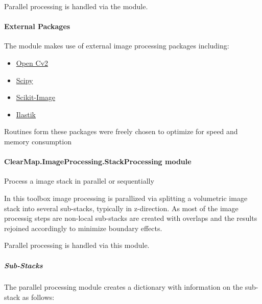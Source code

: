 \documentclass[letterpaper,10pt,english]{sphinxmanual}
\begin{document}
Parallel processing is handled via the
{\hyperref[api/ClearMap.ImageProcessing:module-ClearMap.ImageProcessing.StackProcessing]{\emph{}}} module.


\paragraph{External Packages}
\label{api/ClearMap.ImageProcessing:external-packages}
The {\hyperref[api/ClearMap.ImageProcessing:module-ClearMap.ImageProcessing]{\emph{}}} module makes use of external image
processing packages including:
\begin{itemize}
\item {} 
\href{http://opencv.org/}{Open Cv2}

\item {} 
\href{http://www.scipy.org/}{Scipy}

\item {} 
\href{http://scikit-image.org/docs/dev/api/skimage.html}{Scikit-Image}

\item {} 
\href{http://ilastik.org/}{Ilastik}

\end{itemize}

Routines form these packages were freely chosen to optimize for speed and
memory consumption


\paragraph{ClearMap.ImageProcessing.StackProcessing module}
\label{api/ClearMap.ImageProcessing:clearmap-imageprocessing-stackprocessing-module}\label{api/ClearMap.ImageProcessing:module-ClearMap.ImageProcessing.StackProcessing}
Process a image stack in parallel or sequentially

In this toolbox image processing is parallized via splitting a volumetric
image stack into several sub-stacks, typically in z-direction. As most of
the image processig steps are non-local sub-stacks are created with overlaps
and the results rejoined accordingly to minimize boundary effects.

Parallel processing is handled via this module.


\subparagraph{Sub-Stacks}
\label{api/ClearMap.ImageProcessing:sub-stacks}\label{api/ClearMap.ImageProcessing:substack}
The parallel processing module creates a dictionary with information on
the sub-stack as follows:
\end{document}
